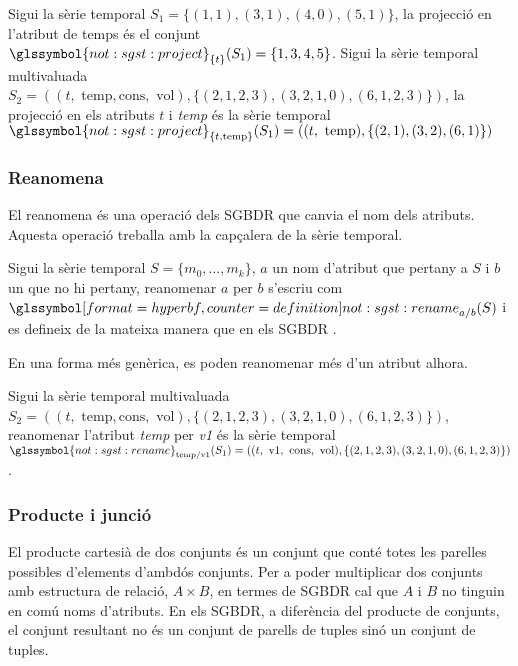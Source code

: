 \begin{example}
  Sigui la sèrie temporal $S_1=\{(1,1),(3,1),(4,0),(5,1)\}$, la
  projecció en l'atribut de temps és el conjunt
  $\glssymbol{not:sgst:project}_{\{t\}}(S_1) = \{ 1,3,4,5 \}$.  Sigui
  la sèrie temporal multivaluada $S_2 = ( (t,\text{ temp},\text{
    cons},\text{ vol}),\{ (2,1,2,3), (3,2,1,0), (6,1,2,3) \})$, la
  projecció en els atributs $t$ i \emph{temp} és la sèrie temporal
  $\glssymbol{not:sgst:project}_{ \{t,\text{temp}\}}(S_1) = (
  (t,\text{ temp}),\{ (2,1), (3,2), (6,1) \})$
\end{example}







\subsubsection{Reanomena}

El reanomena és una operació dels \gls{SGBDR} que canvia el nom dels
atributs.  Aquesta operació treballa amb la
capçalera de la sèrie temporal.


\begin{definition}[reanomena]
  Sigui la sèrie temporal $S=\{ m_0,\dotsc,m_k\}$, $a$ un nom
  d'atribut que pertany a $S$ i $b$ un que no hi pertany, reanomenar
  $a$ per $b$ s'escriu com $\glssymboldef{not:sgst:rename}_{a/b} (S)$
  i es defineix de la mateixa manera que en els
  \gls{SGBDR} \parencite[cap.~7]{date04:introduction8}.
\end{definition}

En una forma més genèrica, es poden reanomenar més d'un atribut
alhora.

\begin{example}
  Sigui la sèrie temporal multivaluada $S_2 = ( (t,\text{ temp},\text{
    cons},\text{ vol}),\{ (2,1,2,3), (3,2,1,0), (6,1,2,3) \})$, reanomenar 
  l'atribut \emph{temp} per \emph{v1} és la sèrie temporal
  $\glssymbol{not:sgst:rename}_{\text{temp}/\text{v1}}(S_1) = ( (t,\text{ v1},\text{
    cons},\text{ vol}),\{ (2,1,2,3), (3,2,1,0), (6,1,2,3) \})$.
\end{example}



\subsubsection{Producte i junció}

El producte cartesià de dos conjunts és un conjunt que conté totes les
parelles possibles d'elements d'ambdós conjunts.  Per a poder
multiplicar dos conjunts amb estructura de relació, $A \times B$, en
termes de \gls{SGBDR} cal que $A$ i $B$ no tinguin en comú noms
d'atributs.  En els \gls{SGBDR}, a diferència del producte de conjunts, el
conjunt resultant no és un conjunt de parells de tuples sinó un
conjunt de tuples.

